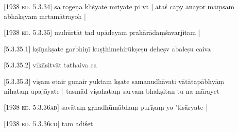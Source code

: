 \documentclass[14pt]{book}
\newcommand*{\caesura}{\linebreak}
\begin{document}
                         \textsc{[1938 ed. 5.3.34]}
                        \caesura {} sa rogeṇa kliśyate mriyate pi vā | \caesura ataś cāpy anayor māṃsam abhakṣyam mṛtamātrayoḥ | 
\pend

 
\pstart

                         \textsc{[1938 ed. 5.3.35]}
                        \caesura muhūrtāt tad upādeyam prahārādaṃśavarjitam
 | 
\pend

 
\pstart

                         \textsc{[5.3.35.1]}
                        \caesura kṣīṇakṣate  garbhiṇī kuṣṭhimehirūkṣeṣu deheṣv abaleṣu caiva | 
 
\pend

 
\pstart

                         \textsc{[5.3.35.2]}
                        \caesura
                        \caesura {}   vikāsitvāt tathaiva ca 
\pend

 
\pstart

                         \textsc{[5.3.35.3]}
                        \caesura viṣam etair guṇair yuktaṃ kṣate samanudhāvati \caesura vātātapābhyāṃ nihataṃ  upajāyate | \caesura tasmād viṣahataṃ sarvam bhakṣitan tu na mārayet
 
\pend

 
\pstart

                         \textsc{[1938 ed. 5.3.36ab]}
                        \caesura savātaṃ gṛhadhūmābhaṃ purīṣaṃ yo 'tisāryate | 
\pend

 
\pstart
{}
\pend

 
\pstart

                         \textsc{[1938 ed. 5.3.36cd]}
                        \caesura {}    tam ādiśet 
\pend
\end{document}
